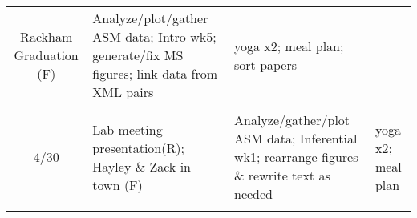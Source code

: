 \documentclass[]{article}
\begin{document}
\begin{longtable}[]{@{}clll@{}}
\begin{minipage}[t]{0.24\columnwidth}
Rackham Graduation (F)\strut
\end{minipage} & \begin{minipage}[t]{0.33\columnwidth}\raggedright\strut
Analyze/plot/gather ASM data; Intro wk5; generate/fix MS figures; link
data from XML pairs\strut
\end{minipage} & \begin{minipage}[t]{0.28\columnwidth}\raggedright\strut
yoga x2; meal plan; sort papers\strut
\end{minipage}\tabularnewline
\begin{minipage}[t]{0.04\columnwidth}\centering\strut
\strut
\end{minipage} & \begin{minipage}[t]{0.24\columnwidth}\raggedright\strut
\strut
\end{minipage} & \begin{minipage}[t]{0.33\columnwidth}\raggedright\strut
\strut
\end{minipage} & \begin{minipage}[t]{0.28\columnwidth}\raggedright\strut
\strut
\end{minipage}\tabularnewline
\begin{minipage}[t]{0.04\columnwidth}\centering\strut
4/30\strut
\end{minipage} & \begin{minipage}[t]{0.24\columnwidth}\raggedright\strut
Lab meeting presentation(R); Hayley \& Zack in town (F)\strut
\end{minipage} & \begin{minipage}[t]{0.33\columnwidth}\raggedright\strut
Analyze/gather/plot ASM data; Inferential wk1; rearrange figures \&
rewrite text as needed\strut
\end{minipage} & \begin{minipage}[t]{0.28\columnwidth}\raggedright\strut
yoga x2; meal plan\strut
\end{minipage}\tabularnewline
\begin{minipage}[t]{0.04\columnwidth}\centering\strut
\strut
\end{minipage} & \begin{minipage}[t]{0.24\columnwidth}\raggedright\strut
\strut
\end{minipage} & \begin{minipage}[t]{0.33\columnwidth}\raggedright\strut
\strut
\end{minipage} & \begin{minipage}[t]{0.28\columnwidth}\raggedright\strut
\strut
\end{minipage}\tabularnewline

\end{longtable}
\end{document}
